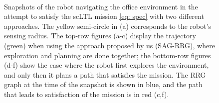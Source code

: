 \begin{figure}
    \centering
     \\
    \caption{Snapshots of the robot navigating the office environment in the attempt to satisfy the scLTL mission \eqref{eq: spec} with two different approaches. The yellow semi-circle in (a) corresponds to the robot's sensing radius. The top-row figures (a-c) display the trajectory (green) when using the approach proposed by us (SAG-RRG), where exploration and planning are done together; the bottom-row figures (d-f) show the case where the robot first explores the environment, and only then it plans a path that satisfies the mission. The RRG graph at the time of the snapshot is shown in blue, and the path that leads to satisfaction of the mission is in red (c,f).}
    \label{fig:snaps}
\end{figure}

